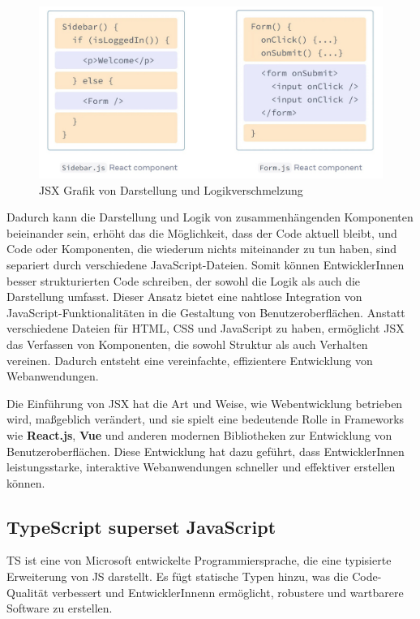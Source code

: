 \begin{figure}[h]
    \centering
    \includegraphics[width=1\textwidth]{images/02/ReactJS-JSX-Component.jpeg}
    \caption{JSX Grafik von Darstellung und Logikverschmelzung\cite{react-jsx-form-component, react-jsx-sidebar-component}}
\end{figure}

Dadurch kann die Darstellung und Logik von zusammenhängenden Komponenten beieinander sein, erhöht das die Möglichkeit, dass der Code aktuell bleibt, und Code oder Komponenten, die wiederum nichts miteinander zu tun haben, sind separiert durch verschiedene JavaScript-Dateien. Somit können EntwicklerInnen besser strukturierten Code schreiben, der sowohl die Logik als auch die Darstellung umfasst. Dieser Ansatz bietet eine nahtlose Integration von JavaScript-Funktionalitäten in die Gestaltung von Benutzeroberflächen. Anstatt verschiedene Dateien für \acs{HTML}, \acs{CSS} und JavaScript zu haben, ermöglicht \acs{JSX} das Verfassen von Komponenten, die sowohl Struktur als auch Verhalten vereinen. Dadurch entsteht eine vereinfachte, effizientere Entwicklung von Webanwendungen.

Die Einführung von \acs{JSX} hat die Art und Weise, wie Webentwicklung betrieben wird, maßgeblich verändert, und sie spielt eine bedeutende Rolle in Frameworks wie \textbf{React.js}, \textbf{Vue} und anderen modernen Bibliotheken zur Entwicklung von Benutzeroberflächen. Diese Entwicklung hat dazu geführt, dass EntwicklerInnen leistungsstarke, interaktive Webanwendungen schneller und effektiver erstellen können.\cite{react-jsx-explained}

\subsection{TypeScript superset JavaScript}

\acf{TS} ist eine von Microsoft entwickelte Programmiersprache, die eine typisierte Erweiterung von \acl{JS} darstellt. Es fügt statische Typen hinzu, was die Code-Qualität verbessert und EntwicklerInnenn ermöglicht, robustere und wartbarere Software zu erstellen. \cite{typescript}


